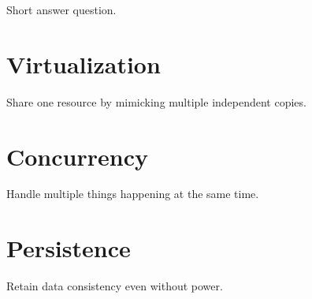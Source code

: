 \documentclass[twoside]{article}
\begin{document}
\begin{warning}
    Short answer question.
\end{warning}

\cleardoublepage

\section{Virtualization}
\begin{definition}
    Share one resource by mimicking multiple independent copies.
\end{definition}
\cleardoublepage

\section{Concurrency}
\begin{definition}
    Handle multiple things happening at the same time.
\end{definition}
\cleardoublepage

\section{Persistence}
\begin{definition}
    Retain data consistency even without power.
\end{definition}
\end{document}
